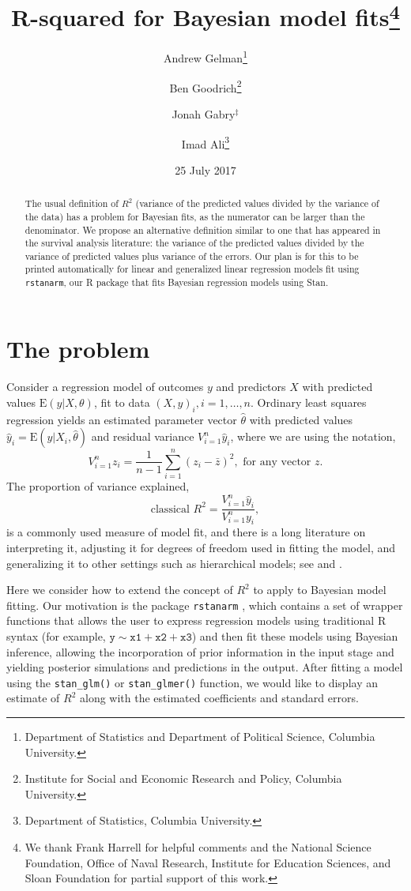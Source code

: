 \documentclass[11pt]{article}
\title{\bf R-squared for Bayesian model fits\footnote{We thank Frank Harrell for helpful comments and the National Science Foundation, Office of Naval Research, Institute for Education Sciences, and Sloan Foundation for partial support of this work.}\vspace{.1in}}
\author{Andrew Gelman\footnote{Department of Statistics and Department of Political Science, Columbia University.} \and Ben Goodrich\footnote{Institute for Social and Economic Research and Policy, Columbia University.} \and Jonah Gabry$^\ddagger$ \and Imad Ali\footnote{Department of Statistics, Columbia University.}\vspace{.1in}}
\date{25 July 2017\vspace{-.1in}}
\begin{document}
\sloppy
\maketitle
\thispagestyle{empty}

\begin{abstract}
The usual definition of $R^2$ (variance of the predicted values divided by the
variance of the data) has a problem for Bayesian fits, as the numerator can be
larger than the denominator.  We propose an alternative definition similar to 
one that has appeared in the survival analysis literature:  the variance of the 
predicted values divided by the variance of predicted values plus variance of 
the errors. Our plan is for this to be printed automatically for linear and 
generalized linear regression models fit using {\tt rstanarm}, our R package 
that fits Bayesian regression models using Stan.
\end{abstract}

\section{The problem}

Consider a regression model of outcomes $y$ and predictors $X$ with predicted
values $\mbox{E}(y|X,\theta)$, fit to data $(X,y)_i, i=1,\ldots,n$.  Ordinary
least squares regression yields an estimated parameter vector $\hat{\theta}$
with predicted values $\hat{y}_i=\mbox{E}(y|X_i,\hat{\theta})$ and residual
variance $V_{i=1}^n \hat{y}_i$, where we are using the notation,
%
$$
V_{i=1}^nz_i = \frac{1}{n-1}\sum_{i=1}^n(z_i-\bar{z})^2, \mbox{ for any vector }z.
$$
%
The proportion of variance explained,
%
\begin{equation}\label{rsq1}
\mbox{classical } R^2=\frac{V_{i=1}^n\hat{y}_i}{V_{i=1}^n y_i},
\end{equation}
%
is a commonly used measure of model fit, and there is a long literature on
interpreting it, adjusting it for degrees of freedom used in fitting the model,
and generalizing it to other settings such as hierarchical models; see \cite{Xu2003}
and \cite{GelmanPardoe2006}.

Here we consider how to extend the concept of $R^2$ to apply to Bayesian model
fitting.  Our motivation is the package {\tt rstanarm} \citep{rstanarmRpackage}, 
which contains a set of wrapper functions that allows the user to express
regression models using traditional R syntax
(for example, $\mathtt{y \sim x1 + x2 + x3}$)
and then fit these models using Bayesian inference, allowing the incorporation
of prior information in the input stage and yielding posterior simulations and
predictions in the output.  After fitting a model using the \verb#stan_glm()#
or \verb#stan_glmer()# function, we would like to display an estimate of $R^2$ 
along with the estimated coefficients and standard errors.
\end{document}
